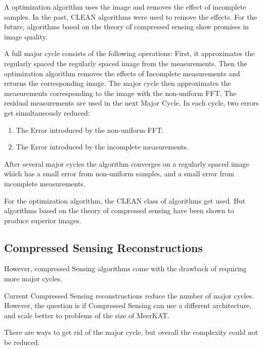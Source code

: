 A optimization algorithm uses the image and removes the effect of incomplete samples. In the past, CLEAN algorithms were used to remove the effects. For the future, algorithms based on the theory of compressed sensing show promises in image quality.

A full major cycle consists of the following operations: First, it approximates the regularly spaced the regularly spaced image from the measurements. Then the optimization algorithm removes the effects of Incomplete measurements and returns the corresponding image. The major cycle then approximates the measurements corresponding to the image with the non-uniform FFT. The residual measurements are used in the next Major Cycle. In each cycle, two errors get simultaneously reduced:

\begin{enumerate}
	\item The Error introduced by the non-uniform FFT.
	\item The Error introduced by the incomplete measurements.
\end{enumerate}

After several major cycles the algorithm converges on a regularly spaced image which has a small error from non-uniform samples, and a small error from incomplete measurements.

For the optimization algorithm, the CLEAN class of algorithms get used. But algorithms based on the theory of compressed sensing have been shown to produce superior images.


\subsection{Compressed Sensing Reconstructions}
 However, compressed Sensing algorithms come with the drawback of requiring more major cycles.

Current Compressed Sensing reconstructions reduce the number of major cycles. However, the question is if Compressed Sensing can use a different architecture, and scale better to problems of the size of MeerKAT.

There are ways to get rid of the major cycle, but overall the complexity could not be reduced.










